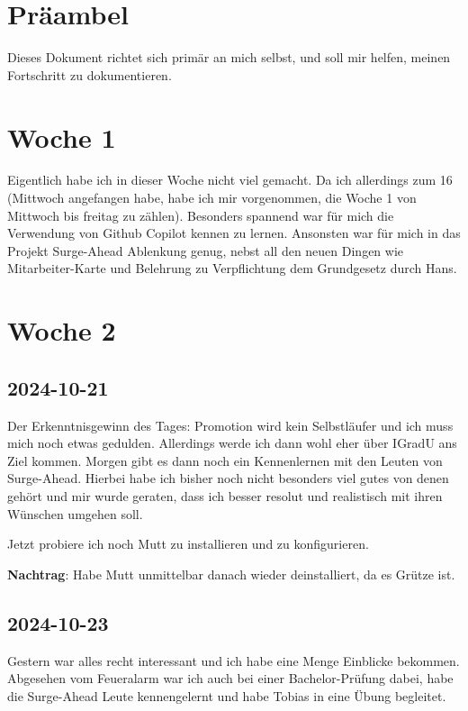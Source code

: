 \documentclass{article}
\begin{document}
\section{Präambel}%
\label{sec:Präambel}
Dieses Dokument richtet sich primär an mich selbst, und soll mir helfen, meinen Fortschritt zu dokumentieren.

\section{Woche 1}%
\label{sec:Woche 1}

Eigentlich habe ich in dieser Woche nicht viel gemacht.
Da ich allerdings zum 16 (Mittwoch angefangen habe, habe ich mir vorgenommen, die Woche 1 von Mittwoch bis freitag zu zählen).
Besonders spannend war für mich die Verwendung von Github Copilot kennen zu lernen.
Ansonsten war für mich in das Projekt Surge-Ahead Ablenkung genug, nebst all den neuen Dingen wie Mitarbeiter-Karte und Belehrung zu Verpflichtung dem Grundgesetz durch Hans.

\section{Woche 2}%
\label{sec:Woche 2}

\subsection{2024-10-21}%
\label{sub:2024-10-21}
Der Erkenntnisgewinn des Tages: Promotion wird kein Selbstläufer und ich muss mich noch etwas gedulden.
Allerdings werde ich dann wohl eher über IGradU ans Ziel kommen.
Morgen gibt es dann noch ein Kennenlernen mit den Leuten von Surge-Ahead.
Hierbei habe ich bisher noch nicht besonders viel gutes von denen gehört und mir wurde geraten, dass ich besser resolut und realistisch mit ihren Wünschen umgehen soll.

Jetzt probiere ich noch Mutt zu installieren und zu konfigurieren.

\textbf{Nachtrag}: Habe Mutt unmittelbar danach wieder deinstalliert, da es Grütze ist.

\subsection{2024-10-23}%
\label{sub:2024-10-23}
Gestern war alles recht interessant und ich habe eine Menge Einblicke bekommen.
Abgesehen vom Feueralarm war ich auch bei einer Bachelor-Prüfung dabei, habe die Surge-Ahead Leute kennengelernt und habe Tobias in eine Übung begleitet.
\end{document}
